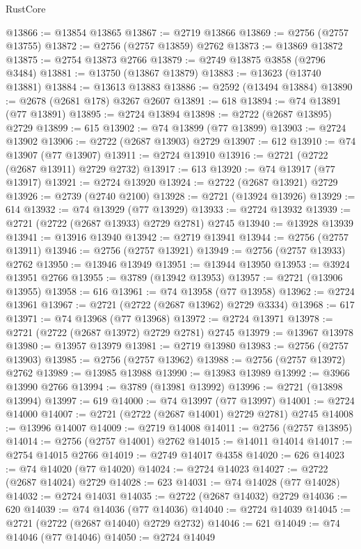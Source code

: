 \begin{lexlean}{RustCore}
\begin{coremodule}
@13866 := @13854 @13865
@13867 := @2719 @13866
@13869 := @2756 (@2757 @13755)
@13872 := @2756 (@2757 @13859) @2762
@13873 := @13869 @13872
@13875 := @2754 @13873 @2766
@13879 := @2749 @13875 @3858 (@2796 @3484)
@13881 := @13750 (@13867 @13879)
@13883 := @13623 (@13740 @13881)
@13884 := @13613 @13883
@13886 := @2592 (@13494 @13884)
@13890 := @2678 (@2681 @178) @3267 @2607
@13891 := 618
@13894 := @74 @13891 (@77 @13891)
@13895 := @2724 @13894
@13898 := @2722 (@2687 @13895) @2729
@13899 := 615
@13902 := @74 @13899 (@77 @13899)
@13903 := @2724 @13902
@13906 := @2722 (@2687 @13903) @2729
@13907 := 612
@13910 := @74 @13907 (@77 @13907)
@13911 := @2724 @13910
@13916 := @2721 (@2722 (@2687 @13911) @2729 @2732)
@13917 := 613
@13920 := @74 @13917 (@77 @13917)
@13921 := @2724 @13920
@13924 := @2722 (@2687 @13921) @2729
@13926 := @2739 (@2740 @2100)
@13928 := @2721 (@13924 @13926)
@13929 := 614
@13932 := @74 @13929 (@77 @13929)
@13933 := @2724 @13932
@13939 := @2721 (@2722 (@2687 @13933) @2729 @2781) @2745
@13940 := @13928 @13939
@13941 := @13916 @13940
@13942 := @2719 @13941
@13944 := @2756 (@2757 @13911)
@13946 := @2756 (@2757 @13921)
@13949 := @2756 (@2757 @13933) @2762
@13950 := @13946 @13949
@13951 := @13944 @13950
@13953 := @3924 @13951 @2766
@13955 := @3789 (@13942 @13953)
@13957 := @2721 (@13906 @13955)
@13958 := 616
@13961 := @74 @13958 (@77 @13958)
@13962 := @2724 @13961
@13967 := @2721 (@2722 (@2687 @13962) @2729 @3334)
@13968 := 617
@13971 := @74 @13968 (@77 @13968)
@13972 := @2724 @13971
@13978 := @2721 (@2722 (@2687 @13972) @2729 @2781) @2745
@13979 := @13967 @13978
@13980 := @13957 @13979
@13981 := @2719 @13980
@13983 := @2756 (@2757 @13903)
@13985 := @2756 (@2757 @13962)
@13988 := @2756 (@2757 @13972) @2762
@13989 := @13985 @13988
@13990 := @13983 @13989
@13992 := @3966 @13990 @2766
@13994 := @3789 (@13981 @13992)
@13996 := @2721 (@13898 @13994)
@13997 := 619
@14000 := @74 @13997 (@77 @13997)
@14001 := @2724 @14000
@14007 := @2721 (@2722 (@2687 @14001) @2729 @2781) @2745
@14008 := @13996 @14007
@14009 := @2719 @14008
@14011 := @2756 (@2757 @13895)
@14014 := @2756 (@2757 @14001) @2762
@14015 := @14011 @14014
@14017 := @2754 @14015 @2766
@14019 := @2749 @14017 @4358
@14020 := 626
@14023 := @74 @14020 (@77 @14020)
@14024 := @2724 @14023
@14027 := @2722 (@2687 @14024) @2729
@14028 := 623
@14031 := @74 @14028 (@77 @14028)
@14032 := @2724 @14031
@14035 := @2722 (@2687 @14032) @2729
@14036 := 620
@14039 := @74 @14036 (@77 @14036)
@14040 := @2724 @14039
@14045 := @2721 (@2722 (@2687 @14040) @2729 @2732)
@14046 := 621
@14049 := @74 @14046 (@77 @14046)
@14050 := @2724 @14049

\end{coremodule}
\end{lexlean}
